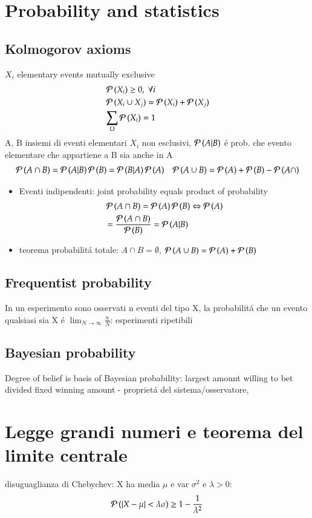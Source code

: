 \documentclass[main.tex]{subfiles}
\begin{document}
\chapter{Probability and statistics}

\section{Kolmogorov axioms}
$X_i$ elementary events mutually exclusive
\begin{align*}
&\operatorname{\mathcal{P}}{(X_i)}\geq0,\ \forall i\\
&\operatorname{\mathcal{P}}{(X_i\cup X_j)}=\operatorname{\mathcal{P}}{(X_i)}+\operatorname{\mathcal{P}}{(X_j)}\\
&\sum_{\Omega}\operatorname{\mathcal{P}}{(X_i)}=1
\end{align*}
A, B insiemi di eventi elementari $X_i$ non esclusivi, $\operatorname{\mathcal{P}}{(A|B)}$ \'e prob. che evento elementare che appartiene a B sia anche in A
\begin{align*}
&\operatorname{\mathcal{P}}{(A\cap B)}=\operatorname{\mathcal{P}}{(A|B)}\operatorname{\mathcal{P}}{(B)}=\operatorname{\mathcal{P}}{(B|A)}\operatorname{\mathcal{P}}{(A)}
&\operatorname{\mathcal{P}}{(A\cup B)}=\operatorname{\mathcal{P}}{(A)}+\operatorname{\mathcal{P}}{(B)}-\operatorname{\mathcal{P}}{(A\cap)} 
\end{align*}
\begin{itemize}
\item Eventi indipendenti: joint probability equals product of probability
\begin{align*}
&\operatorname{\mathcal{P}}{(A\cap B)}=\operatorname{\mathcal{P}}{(A)}\operatorname{\mathcal{P}}{(B)}\Leftrightarrow \operatorname{\mathcal{P}}{(A)}\\
&=\frac{\operatorname{\mathcal{P}}{(A\cap B)}}{\operatorname{\mathcal{P}}{(B)}}=\operatorname{\mathcal{P}}{(A|B)}
\end{align*}
\item teorema probabilit\'a totale: $A\cap B=\emptyset$, $\operatorname{\mathcal{P}}{(A\cup B)}=\operatorname{\mathcal{P}}{(A)}+\operatorname{\mathcal{P}}{(B)}$
\end{itemize}

\section{Frequentist probability}

In un esperimento sono osservati n eventi del tipo X, la probabilit\'a che un evento qualsiasi sia X \'e $\lim_{N\to\infty}\frac{n}{N}$: esperimenti ripetibili

\section{Bayesian probability}

Degree of belief is basis of Bayesian probability: largest amount willing to bet divided fixed winning amount - propriet\'a del sistema/osservatore, 

\chapter{Legge grandi numeri e teorema del limite centrale}

disuguaglianza di Chebychev: X ha media $\mu$ e var $\sigma^2$ e $\lambda>0$:
\[\operatorname{\mathcal{P}}{(|X-\mu|<\lambda\sigma)}\geq1-\frac{1}{\lambda^2}\]
\end{document}
